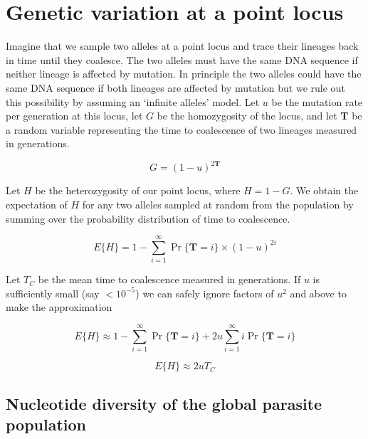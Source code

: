 \documentclass[_main.tex]{subfiles}
\begin{document}
\section{Genetic variation at a point locus}
\label{supp_point_locus}

Imagine that we sample two alleles at a point locus and trace their lineages back in time until they coalesce.  The two alleles must have the same DNA sequence if neither lineage is affected by mutation.  In principle the two alleles could have the same DNA sequence if both lineages are affected by mutation but we rule out this possibility by assuming an `infinite alleles' model.  Let $u$ be the mutation rate per generation at this locus, let $G$ be the homozygosity of the locus, and let \textbf{T} be a random variable representing the time to coalescence of two lineages measured in generations.

\begin{equation*}
G = (1 - u)^{2 \textbf{T}}
\label{eq:supp_G}
\end{equation*}

Let $H$ be the heterozygosity of our point locus, where $H = 1 - G$.  We obtain the expectation of $H$ for any two alleles sampled at random from the population by summing over the probability distribution of time to coalescence.  
  
\begin{equation*}
E \{ H  \} = 1 - \sum_{i=1}^\infty \Pr \{ \textbf{T} = i \} \times (1-u)^{2i}
\label{eq:supp_het_pdf}
\end{equation*}

Let $T_C$ be the mean time to coalescence measured in generations.  If $u$ is sufficiently small (say $<10^{-5}$) we can safely ignore factors of $u^2$ and above to make the approximation

\begin{equation*}
E \{ H  \} \approx 1 - \sum_{i=1}^\infty \Pr \{ \textbf{T} = i \}  + 2u \sum_{i=1}^\infty i\Pr \{ \textbf{T} = i \}
\label{eq:supp_het_pdf}
\end{equation*}

\begin{equation*}
E \{ H \} \approx 2 u T_C
\label{eq:supp_het_approx}
\end{equation*}


\subsection{Nucleotide diversity of the global parasite population}
\label{supp_global_pi}
\end{document}
